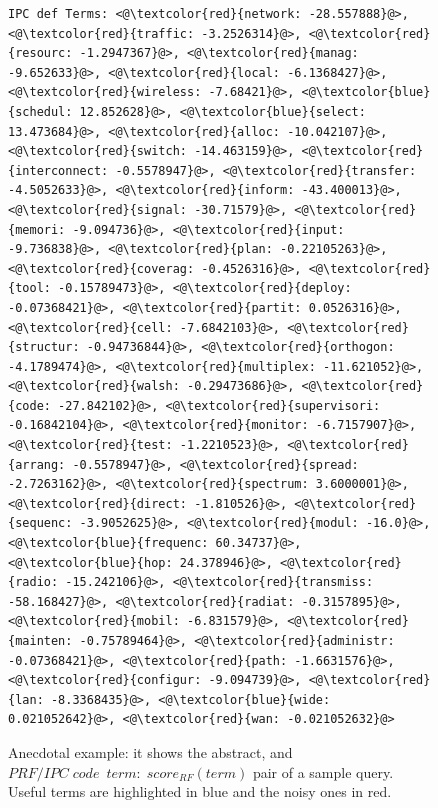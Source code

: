 \documentclass{sig-alternate}
\begin{document}
\begin{figure}[htpb]
\begin{framed}
\begin{lstlisting}[basicstyle=\tiny\ttfamily , linewidth=\columnwidth,breaklines=true]
IPC def Terms: <@\textcolor{red}{network: -28.557888}@>, <@\textcolor{red}{traffic: -3.2526314}@>, <@\textcolor{red}{resourc: -1.2947367}@>, <@\textcolor{red}{manag: -9.652633}@>, <@\textcolor{red}{local: -6.1368427}@>, <@\textcolor{red}{wireless: -7.68421}@>, <@\textcolor{blue}{schedul: 12.852628}@>, <@\textcolor{blue}{select: 13.473684}@>, <@\textcolor{red}{alloc: -10.042107}@>, <@\textcolor{red}{switch: -14.463159}@>, <@\textcolor{red}{interconnect: -0.5578947}@>, <@\textcolor{red}{transfer: -4.5052633}@>, <@\textcolor{red}{inform: -43.400013}@>, <@\textcolor{red}{signal: -30.71579}@>, <@\textcolor{red}{memori: -9.094736}@>, <@\textcolor{red}{input: -9.736838}@>, <@\textcolor{red}{plan: -0.22105263}@>, <@\textcolor{red}{coverag: -0.4526316}@>, <@\textcolor{red}{tool: -0.15789473}@>, <@\textcolor{red}{deploy: -0.07368421}@>, <@\textcolor{red}{partit: 0.0526316}@>, <@\textcolor{red}{cell: -7.6842103}@>, <@\textcolor{red}{structur: -0.94736844}@>, <@\textcolor{red}{orthogon: -4.1789474}@>, <@\textcolor{red}{multiplex: -11.621052}@>, <@\textcolor{red}{walsh: -0.29473686}@>, <@\textcolor{red}{code: -27.842102}@>, <@\textcolor{red}{supervisori: -0.16842104}@>, <@\textcolor{red}{monitor: -6.7157907}@>, <@\textcolor{red}{test: -1.2210523}@>, <@\textcolor{red}{arrang: -0.5578947}@>, <@\textcolor{red}{spread: -2.7263162}@>, <@\textcolor{red}{spectrum: 3.6000001}@>, <@\textcolor{red}{direct: -1.810526}@>, <@\textcolor{red}{sequenc: -3.9052625}@>, <@\textcolor{red}{modul: -16.0}@>, <@\textcolor{blue}{frequenc: 60.34737}@>, <@\textcolor{blue}{hop: 24.378946}@>, <@\textcolor{red}{radio: -15.242106}@>, <@\textcolor{red}{transmiss: -58.168427}@>, <@\textcolor{red}{radiat: -0.3157895}@>,  <@\textcolor{red}{mobil: -6.831579}@>, <@\textcolor{red}{mainten: -0.75789464}@>, <@\textcolor{red}{administr: -0.07368421}@>, <@\textcolor{red}{path: -1.6631576}@>, <@\textcolor{red}{configur: -9.094739}@>, <@\textcolor{red}{lan: -8.3368435}@>, <@\textcolor{blue}{wide: 0.021052642}@>, <@\textcolor{red}{wan: -0.021052632}@>
 \end{lstlisting} 
 \vspace*{-2ex}
\end{framed}
 \vspace*{-2ex}
  \caption{Anecdotal example: it shows the abstract, and $ PRF/IPC\;code\ \; term: \; score_{RF}(term) $ pair of a sample query. Useful terms are highlighted in blue and the noisy ones in red.}
  \label{fig:anecdotal}  
\end{figure}
\end{document}

